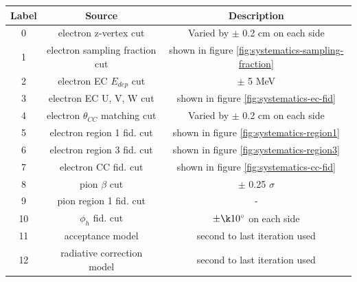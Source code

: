 \begin{table}
	\centering
	\label{table:systematic-sources}
	
	\begin{tabular}{c | c | c }
	
	Label & Source & Description \\ 
	\hline 
	
	0      & electron z-vertex cut                          & Varied by $\pm$ 0.2 cm on each side \\ 
	1      & electron sampling fraction cut            & shown in figure \ref{fig:systematics-sampling-fraction} \\ 
	2      & electron EC $E_{dep}$ cut                  & $\pm$ 5 MeV \\ 
	3      & electron EC U, V, W cut                       & shown in figure \ref{fig:systematics-ec-fid} \\ 
	4      & electron $\theta_{CC}$ matching cut & Varied by $\pm$ 0.2 cm on each side \\ 
	5      & electron region 1 fid. cut                      & shown in figure \ref{fig:systematics-region1} \\ 
	6      & electron region 3 fid. cut                     & shown in figure \ref{fig:systematics-region3} \\ 
	7      & electron CC fid. cut                              & shown in figure \ref{fig:systematics-cc-fid} \\ 
	8      & pion $\beta$ cut                                   & $\pm$ 0.25 $\sigma$ \\ 
	9      & pion region 1 fid. cut                             & - \\ 
	10    & $\phi_h$ fid. cut                                    & $\pm \k 10^{\circ}$ on each side \\ 
	11     & acceptance model                                & second to last iteration used \\ 
    12     & radiative correction model                   & second to last iteration used \\ 
	
	\end{tabular}		
\end{table}

